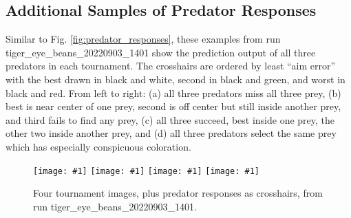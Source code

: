 \documentclass[acmtog,
    anonymous,
    review
    ]{acmart}
\newcommand{\runID}{\footnotesize}
\newcommand{\igfour}[1]{\texttt{[image: \#1]}}
\begin{document}
\subsection{Additional Samples of Predator Responses}
Similar to Fig. \ref{fig:predator_responses}, these examples from run {\runID tiger\_eye\_beans\_20220903\_1401} show the prediction output of all three predators in each tournament. The crosshairs are ordered by least “aim error” with the best drawn in black and white, second in black and green, and worst in black and red. From left to right: (a) all three predators miss all three prey, (b) best is near center of one prey, second is off center but still inside another prey, and third fails to find any prey, (c) all three succeed, best inside one prey, the other two inside another prey, and (d) all three predators select the same prey which has especially conspicuous coloration.
\par

\begin{figure}[H]
    \igfour{20220904_step_4883.png}
    \hfill
    \igfour{20220904_step_4788.png}
    \hfill
    \igfour{20220904_step_3914.png}
    \hfill
    \igfour{20220904_step_4636.png}
    \caption{Four tournament images, plus predator responses as crosshairs, from run {\runID tiger\_eye\_beans\_20220903\_1401}.}
    \label{fig:tiger_eye_beans_4x}
\end{figure}


\end{document}
